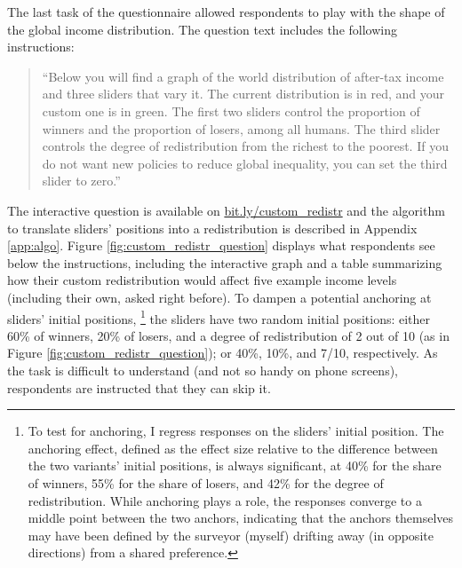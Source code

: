 \documentclass[12pt,english]{article}
\begin{document}
\begin{bibunit}
The last task of the questionnaire allowed respondents to play with the shape of the global income distribution. The question text includes the following instructions: 
\begin{quote}``Below you will find a graph of the world distribution of after-tax income and three sliders that vary it. The current distribution is in red, and your custom one is in green. The first two sliders control the proportion of winners and the proportion of losers, among all humans. The third slider controls the degree of redistribution from the richest to the poorest. %
If you do not want new policies to reduce global inequality, you can set the third slider to zero.''\end{quote} 
The interactive question is available on \href{https://bit.ly/custom_redistr}{bit.ly/custom\_redistr} and the algorithm to translate sliders' positions into a redistribution is described in Appendix \ref{app:algo}. %
Figure \ref{fig:custom_redistr_question} displays what respondents see below the instructions, including the interactive graph and a table summarizing how their custom redistribution would affect five example income levels (including their own, asked right before). To dampen a potential anchoring at sliders' initial positions,%
\footnote{To test for anchoring, I regress responses on the sliders' initial position. %
The anchoring effect, defined as the effect size relative to the difference between the two variants' initial positions, is always significant, at 40\% for the share of winners, 55\% for the share of losers, and 42\% for the degree of redistribution. While anchoring plays a role, the responses converge to a middle point between the two anchors, indicating that the anchors themselves may have been defined by the surveyor (myself) drifting away (in opposite directions) from a shared preference. %
} 
the sliders have two random initial positions: %
either %
60\% of winners, 20\% of losers, and a degree of redistribution of 2 out of 10 (as in Figure \ref{fig:custom_redistr_question}); or %
40\%, 10\%, and 7/10, respectively. 
As the task is difficult to understand (and not so handy %
on phone screens), respondents are instructed that they can skip it. 


\end{bibunit}
\end{document}
